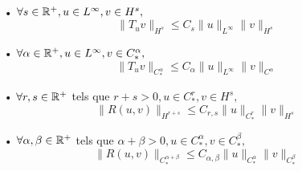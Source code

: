 \documentclass[11pt,a4paper]{article}
\begin{document}
\begin{prop} ~\\
\begin{itemize}
\item[•] $\forall s\in \mathbb R^+, u \in L^\infty, v\in H^s,$
\begin{equation}\label{estim1}
\|T_uv\|_{H^s} \leq C_s \|u\|_{L^\infty} \|v\|_{H^s}
\end{equation}
\item[•] $\forall \alpha \in \mathbb R^+, u \in L^\infty, v\in C^\alpha_*,$
\begin{equation}\label{estim2}
\|T_uv\|_{C^\alpha_*} \leq C_\alpha \|u\|_{L^\infty} \|v\|_{C^\alpha}
\end{equation}
\item[•] $\forall r,s\in \mathbb R^+$ tels que $r+s>0, u \in C^r_*, v\in H^s,$
\begin{equation}\label{estim3}
\|R(u,v)\|_{H^{r+s}} \leq C_{r,s} \|u\|_{C^r_*} \|v\|_{H^s}
\end{equation}
\item[•] $\forall \alpha,\beta\in \mathbb R^+$ tels que $\alpha + \beta>0, u \in C^\alpha_*, v\in C^\beta_*,$
\begin{equation}\label{estim4}
\|R(u,v)\|_{C^{\alpha + \beta}_*} \leq C_{\alpha,\beta} \|u\|_{C^\alpha_*} \|v\|_{C^\beta_*}
\end{equation}
\end{itemize}
\end{prop}
\end{document}
